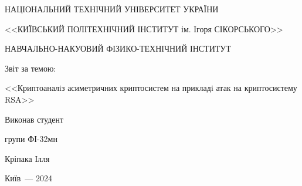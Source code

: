 
	\thispagestyle{empty}
	
	\begin{center}
		НАЦІОНАЛЬНИЙ ТЕХНІЧНИЙ УНІВЕРСИТЕТ УКРАЇНИ \par
		<<КИЇВСЬКИЙ ПОЛІТЕХНІЧНИЙ ІНСТИТУТ ім. Ігоря СІКОРСЬКОГО>>\par
		НАВЧАЛЬНО-НАКУОВИЙ ФІЗИКО-ТЕХНІЧНИЙ ІНСТИТУТ\par
		
		\vspace{60mm}
		{\huge Звіт за темою:\par
			\LARGE <<Криптоаналiз асиметричних криптосистем на прикладi атак на криптосистему RSA>>\par}
		
	\end{center}
	
	\vspace{50mm}
	\begin{flushright}
		Виконав студент
		
		групи ФІ-32мн
		
		Кріпака Ілля
		
	\end{flushright}
	
	\vspace{27mm}
	\begin{center}
		{Київ~--- 2024}
	\end{center}
	
